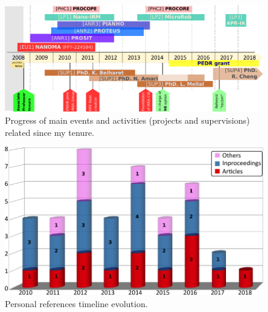 \medskip

\begin{figure}[tbh]
  \centering
  \includegraphics[width=1\linewidth-1pt]{fig/chapI/dfolio_timeline} %
  \caption[Progress of main events and activities.]{Progress of main events and activities (\eg projects and supervisions) related since my tenure.}
  \label{fig:timeline}
\end{figure}
%
\begin{figure}[tbh]
  \centering
  \includegraphics[scale=1]{fig/chapI/dfolio_publis} %
  \caption[Personal references timeline.]{Personal references timeline evolution.}
  \label{fig:publis}
\end{figure}

